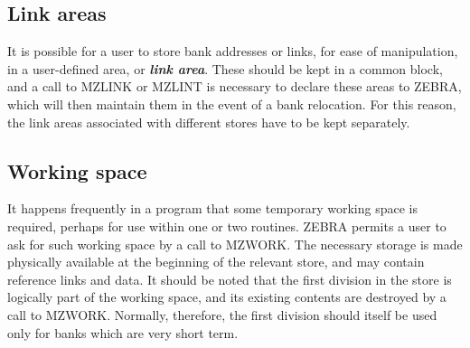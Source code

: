 \subsection{Link areas}
\par
It is possible for a user to store bank addresses or links, for ease
of manipulation, in a user-defined area, or {\bf\it link area}.
These should be kept in a common block, and a call to
MZLINK or MZLINT is necessary to declare these areas to ZEBRA, which
will then maintain them in the event of a bank relocation. For this
reason, the link areas associated with different stores have to be kept
separately.
\subsection{Working space}
\par
It happens frequently in a program that some temporary working space is
required, perhaps for use within one or two routines. ZEBRA permits a
user to ask for such working space by a call to MZWORK. The necessary
storage is made physically available at the beginning of the relevant
store, and may contain reference links and data. It should be noted that
the first division in the store is logically part of the working space,
and its existing contents are destroyed by a call to MZWORK. Normally,
therefore, the first division should itself be used only for banks which
are very short term.
